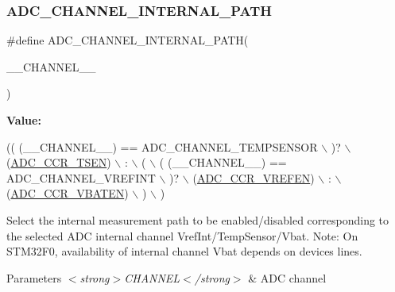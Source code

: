\subsubsection{\texorpdfstring{A\+D\+C\+\_\+\+C\+H\+A\+N\+N\+E\+L\+\_\+\+I\+N\+T\+E\+R\+N\+A\+L\+\_\+\+P\+A\+TH}{ADC\_CHANNEL\_INTERNAL\_PATH}}
{\footnotesize\ttfamily \#define A\+D\+C\+\_\+\+C\+H\+A\+N\+N\+E\+L\+\_\+\+I\+N\+T\+E\+R\+N\+A\+L\+\_\+\+P\+A\+TH(\begin{DoxyParamCaption}\item[{}]{\+\_\+\+\_\+\+C\+H\+A\+N\+N\+E\+L\+\_\+\+\_\+ }\end{DoxyParamCaption})}

{\bfseries Value\+:}
\begin{DoxyCode}
(( (\_\_CHANNEL\_\_) == ADC\_CHANNEL\_TEMPSENSOR                                    \(\backslash\)
  )?                                                                           \(\backslash\)
   (\hyperlink{group___peripheral___registers___bits___definition_gaec05330012f52f35421531c72819fada}{ADC\_CCR\_TSEN})                                                              \(\backslash\)
   :                                                                           \(\backslash\)
   (                                                                           \(\backslash\)
     ( (\_\_CHANNEL\_\_) == ADC\_CHANNEL\_VREFINT                                    \(\backslash\)
     )?                                                                        \(\backslash\)
      (\hyperlink{group___peripheral___registers___bits___definition_gaecc47464aaa52f565d8daa9cf1a86054}{ADC\_CCR\_VREFEN})                                                         \(\backslash\)
      :                                                                        \(\backslash\)
      (\hyperlink{group___peripheral___registers___bits___definition_gaaeefa6f00268db0df10fb97112a9f456}{ADC\_CCR\_VBATEN})                                                         \(\backslash\)
   )                                                                           \(\backslash\)
 )
\end{DoxyCode}


Select the internal measurement path to be enabled/disabled corresponding to the selected A\+DC internal channel Vref\+Int/\+Temp\+Sensor/\+Vbat. Note\+: On S\+T\+M32\+F0, availability of internal channel Vbat depends on devices lines. 


\begin{DoxyParams}{Parameters}
{\em $<$strong$>$\+C\+H\+A\+N\+N\+E\+L$<$/strong$>$} & A\+DC channel \\
\hline
\end{DoxyParams}

